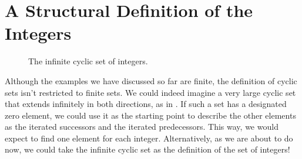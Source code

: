 \section{A Structural Definition of the Integers}

\begin{figure}[t]
  \centering
  \caption[The infinite cyclic set of integers]{The infinite cyclic set of integers.}
  \label{figure:integers}
\end{figure}

Although the examples we have discussed so far are finite, the definition of cyclic sets isn't restricted to finite sets. We could indeed imagine a very large cyclic set that extends infinitely in both directions, as in . If such a set has a designated zero element, we could use it as the starting point to describe the other elements as the iterated successors and the iterated predecessors. This way, we would expect to find one element for each integer. Alternatively, as we are about to do now, we could take the infinite cyclic set as the definition of the set of integers!

